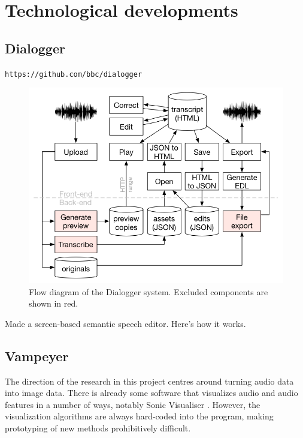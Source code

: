 \chapter{Technological developments}\label{app:tech}

\section{Dialogger}\label{sec:dialogger}

\texttt{https://github.com/bbc/dialogger}

\begin{figure}[h]
\centering
  \includegraphics[width=\columnwidth]{figs/dialogger-flow-diagram.png}
  \caption{Flow diagram of the Dialogger system. Excluded components are shown in red.}
  \label{fig:dialogger-flow}
\end{figure}

Made a screen-based semantic speech editor. Here's how it works.

\clearpage
\section{Vampeyer}\label{sec:vampeyer}
The direction of the research in this project centres around turning audio data into image data. There is already some
software that visualizes audio and audio features in a number of ways, notably Sonic Visualiser \citep{Cannam2010}.
However, the visualization algorithms are always hard-coded into the program, making prototyping of new methods
prohibitively difficult.

